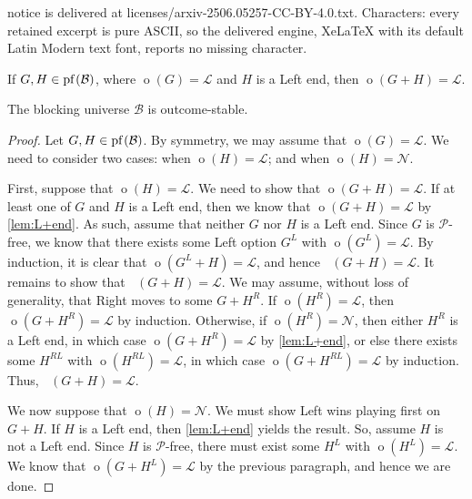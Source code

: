 \documentclass[10pt,a4paper]{amsart}
\DeclareMathOperator{\outcomeL}{o_L}
\DeclareMathOperator{\outcomeR}{o_R}
\DeclareMathOperator{\outcome}{o}
\newcommand{\set}[1]{\mathcal{#1}}
\begin{document}
notice is delivered at licenses/arxiv-2506.05257-CC-BY-4.0.txt. Characters: every retained excerpt is pure ASCII, so the delivered engine, XeLaTeX with its default Latin Modern text font, reports no missing character.
\begin{lemma}
    \label{lem:L+end}
    If $G,H\in\pf{B}$, where $\outcome(G)=\mathscr{L}$ and $H$ is a Left end,
    then $\outcome(G+H)=\mathscr{L}$.
\end{lemma}

\begin{lemma}
    \label{lem:B-outcome-stable}
    The blocking universe $\set{B}$ is outcome-stable.
\end{lemma}

\begin{proof}
    Let $G,H\in\pf{B}$. By symmetry, we may assume that
    $\outcome(G)=\mathscr{L}$. We need to consider two cases: when
    $\outcome(H)=\mathscr{L}$; and when $\outcome(H)=\mathscr{N}$.

    First, suppose that $\outcome(H)=\mathscr{L}$. We need to show that
    $\outcome(G+H)=\mathscr{L}$. If at least one of $G$ and $H$ is a Left end,
    then we know that $\outcome(G+H)=\mathscr{L}$ by \cref{lem:L+end}. As such,
    assume that neither $G$ nor $H$ is a Left end. Since $G$ is
    $\mathscr{P}$-free, we know that there exists some Left option $G^L$ with
    $\outcome(G^L)=\mathscr{L}$. By induction, it is clear that
    $\outcome(G^L+H)=\mathscr{L}$, and hence $\outcomeL(G+H)=\mathscr{L}$. It
    remains to show that $\outcomeR(G+H)=\mathscr{L}$. We may assume, without
    loss of generality, that Right moves to some $G+H^R$. If
    $\outcome(H^R)=\mathscr{L}$, then $\outcome(G+H^R)=\mathscr{L}$ by
    induction. Otherwise, if $\outcome(H^R)=\mathscr{N}$, then either $H^R$ is
    a Left end, in which case $\outcome(G+H^R)=\mathscr{L}$ by
    \cref{lem:L+end}, or else there exists some $H^{RL}$ with
    $\outcome(H^{RL})=\mathscr{L}$, in which case
    $\outcome(G+H^{RL})=\mathscr{L}$ by induction. Thus,
    $\outcomeR(G+H)=\mathscr{L}$.

    We now suppose that $\outcome(H)=\mathscr{N}$. We must show Left wins
    playing first on $G+H$. If $H$ is a Left end, then \cref{lem:L+end} yields
    the result. So, assume $H$ is not a Left end. Since $H$ is
    $\mathscr{P}$-free, there must exist some $H^L$ with
    $\outcome(H^L)=\mathscr{L}$. We know that $\outcome(G+H^L)=\mathscr{L}$ by
    the previous paragraph, and hence we are done.
\end{proof}
\end{document}
